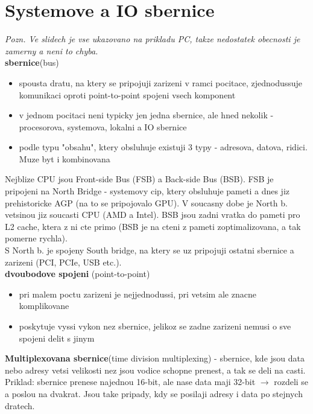 \documentclass[10pt]{article}
\begin{document}
\section*{Systemove a IO sbernice}
\textit{Pozn. Ve slidech je vse ukazovano na prikladu PC, takze nedostatek obecnosti je zamerny a neni to chyba.}\\

\textbf{sbernice}(bus)
\begin{itemize}
\item spousta dratu, na ktery se pripojuji zarizeni v ramci pocitace, zjednodussuje komunikaci oproti point-to-point spojeni vsech komponent
\item v jednom pocitaci neni typicky jen jedna sbernice, ale hned nekolik - procesorova, systemova, lokalni a IO sbernice
\item podle typu "obsahu", ktery obsluhuje existuji 3 typy - adresova, datova, ridici. Muze byt i kombinovana
\end{itemize}
Nejblize CPU jsou Front-side Bus (FSB) a Back-side Bus (BSB). FSB je pripojeni na North Bridge - systemovy cip, ktery obsluhuje pameti a dnes jiz prehistoricke AGP (na to se pripojovalo GPU). V soucasny dobe je North b. vetsinou jiz soucasti CPU (AMD a Intel). BSB jsou zadni vratka do pameti pro L2 cache, ktera z ni cte primo (BSB je na cteni z pameti zoptimalizovana, a tak pomerne rychla).\\
S North b. je spojeny South bridge, na ktery se uz pripojuji ostatni sbernice a zarizeni (PCI, PCIe, USB etc.).\\

\textbf{dvoubodove spojeni} (point-to-point)
\begin{itemize}
\item pri malem poctu zarizeni je nejjednodussi, pri vetsim ale znacne komplikovane
\item poskytuje vyssi vykon nez sbernice, jelikoz se zadne zarizeni nemusi o sve spojeni delit s jinym
\end{itemize}

\textbf{Multiplexovana sbernice}(time division multiplexing) - sbernice, kde jsou data nebo adresy vetsi velikosti nez jsou vodice schopne prenest, a tak se deli na casti. Priklad: sbernice prenese najednou 16-bit, ale nase data maji 32-bit $\rightarrow$ rozdeli se a poslou na dvakrat. Jsou take pripady, kdy se posilaji adresy i data po stejnych dratech.\\
\end{document}
